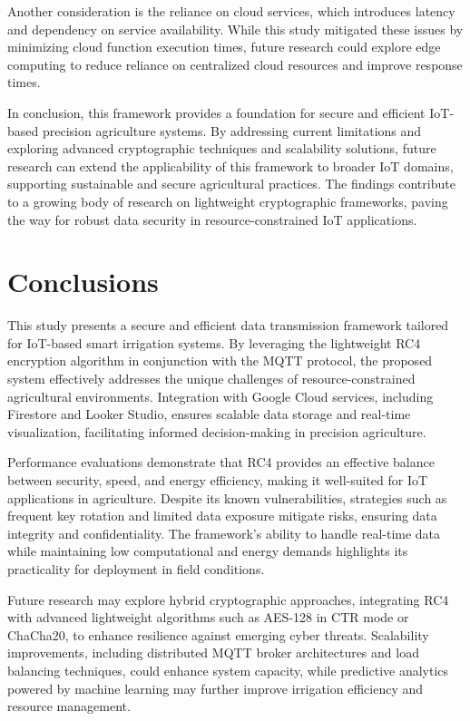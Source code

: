 \documentclass[journal]{Definitions/mdpi}
\begin{document}
Another consideration is the reliance on cloud services, which introduces latency and dependency on service availability. While this study mitigated these issues by minimizing cloud function execution times, future research could explore edge computing to reduce reliance on centralized cloud resources and improve response times.

In conclusion, this framework provides a foundation for secure and efficient IoT-based precision agriculture systems. By addressing current limitations and exploring advanced cryptographic techniques and scalability solutions, future research can extend the applicability of this framework to broader IoT domains, supporting sustainable and secure agricultural practices. The findings contribute to a growing body of research on lightweight cryptographic frameworks, paving the way for robust data security in resource-constrained IoT applications.
\section{Conclusions}

This study presents a secure and efficient data transmission framework tailored for IoT-based smart irrigation systems. By leveraging the lightweight RC4 encryption algorithm in conjunction with the MQTT protocol, the proposed system effectively addresses the unique challenges of resource-constrained agricultural environments. Integration with Google Cloud services, including Firestore and Looker Studio, ensures scalable data storage and real-time visualization, facilitating informed decision-making in precision agriculture.

Performance evaluations demonstrate that RC4 provides an effective balance between security, speed, and energy efficiency, making it well-suited for IoT applications in agriculture. Despite its known vulnerabilities, strategies such as frequent key rotation and limited data exposure mitigate risks, ensuring data integrity and confidentiality. The framework’s ability to handle real-time data while maintaining low computational and energy demands highlights its practicality for deployment in field conditions.

Future research may explore hybrid cryptographic approaches, integrating RC4 with advanced lightweight algorithms such as AES-128 in CTR mode or ChaCha20, to enhance resilience against emerging cyber threats. Scalability improvements, including distributed MQTT broker architectures and load balancing techniques, could enhance system capacity, while predictive analytics powered by machine learning may further improve irrigation efficiency and resource management.
\end{document}

